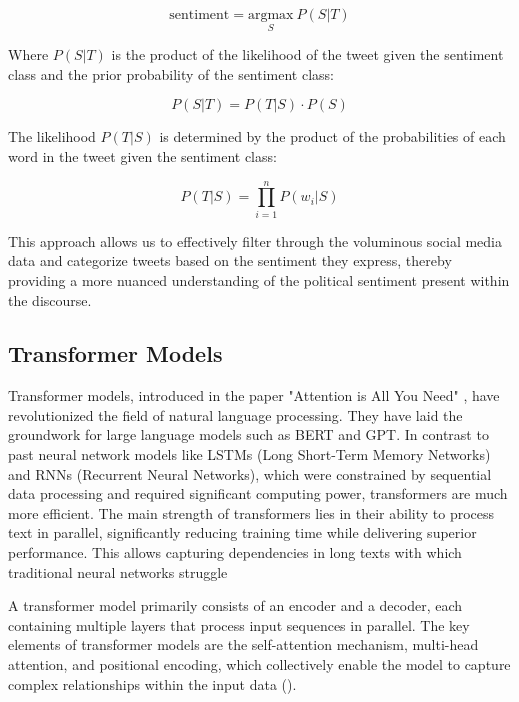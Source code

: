 \documentclass[10pt]{article}
\begin{document}
\begin{multicols}{2}
\begin{equation}
    \text{sentiment} = \underset{S}{\text{argmax}} \ P(S|T)
\end{equation}

Where \( P(S|T) \) is the product of the likelihood of the tweet given the sentiment class and the prior probability of the sentiment class:

\begin{equation}
    P(S|T) = P(T|S) \cdot P(S)
\end{equation}

The likelihood \( P(T|S) \) is determined by the product of the probabilities of each word in the tweet given the sentiment class:

\begin{equation}
    P(T|S) = \prod_{i=1}^{n} P(w_i | S)
\end{equation}

This approach allows us to effectively filter through the voluminous social media data and categorize tweets based on the sentiment they express, thereby providing a more nuanced understanding of the political sentiment present within the discourse.



\subsection{Transformer Models}

Transformer models, introduced in the paper "Attention is All You Need" \cite{vaswani2017attention}, have revolutionized the field of natural language processing. They have laid the groundwork for large language models such as BERT and GPT. In contrast to past neural network models like LSTMs (Long Short-Term Memory Networks) and RNNs (Recurrent Neural Networks), which were constrained by sequential data processing and required significant computing power, transformers are much more efficient. The main strength of transformers lies in their ability to process text in parallel, significantly reducing training time while delivering superior performance. This allows capturing dependencies in long texts with which traditional neural networks struggle

A transformer model primarily consists of an encoder and a decoder, each containing multiple layers that process input sequences in parallel. The key elements of transformer models are the self-attention mechanism, multi-head attention, and positional encoding, which collectively enable the model to capture complex relationships within the input data (\cite{vaswani2017attention}).


\end{multicols}
\end{document}
